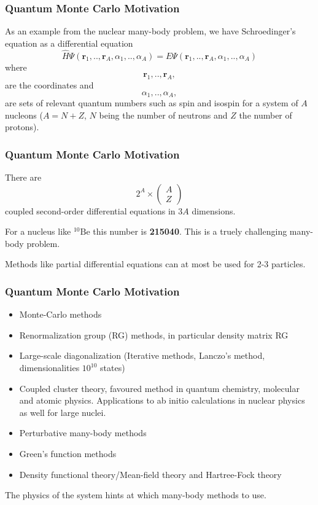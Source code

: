 \documentclass{beamer}
\begin{document}
\begin{frame}
\frametitle{Quantum Monte Carlo Motivation}

\begin{block}{}
As an example from the nuclear many-body problem, we have Schroedinger's equation as a differential equation
\[
  \hat{H}\Psi(\bm{r}_1,..,\bm{r}_A,\alpha_1,..,\alpha_A)=E\Psi(\bm{r}_1,..,\bm{r}_A,\alpha_1,..,\alpha_A)
\]
where
\[
  \bm{r}_1,..,\bm{r}_A,
\]
are the coordinates and 
\[
  \alpha_1,..,\alpha_A,
\]
are sets of relevant quantum numbers such as spin and isospin for a system of  $A$ nucleons ($A=N+Z$, $N$ being the number of neutrons and $Z$ the number of protons).
\end{block}
\end{frame}

\begin{frame}
\frametitle{Quantum Monte Carlo Motivation}

\begin{block}{}
There are
\[
 2^A\times \left(\begin{array}{c} A\\ Z\end{array}\right)
\]
coupled second-order differential equations in $3A$ dimensions.

For a nucleus like ${}^{10}\mbox{Be}$ this number is \textbf{215040}.
This is a truely challenging many-body problem.

Methods like partial differential equations can at most be used for 2-3 particles.
\end{block}
\end{frame}

\begin{frame}
\frametitle{Quantum Monte Carlo Motivation}

\begin{block}{}
\begin{itemize}
\item Monte-Carlo methods

\item Renormalization group (RG) methods, in particular density matrix RG

\item Large-scale diagonalization (Iterative methods, Lanczo's method, dimensionalities  $10^{10}$ states)

\item Coupled cluster theory, favoured method in quantum chemistry, molecular and atomic physics. Applications to ab initio calculations in nuclear physics as well for large nuclei.

\item Perturbative many-body methods 

\item Green's function methods

\item Density functional theory/Mean-field theory and Hartree-Fock theory
\end{itemize}

\noindent
The physics of the system hints at which many-body methods to use.
\end{block}
\end{frame}
\end{document}
